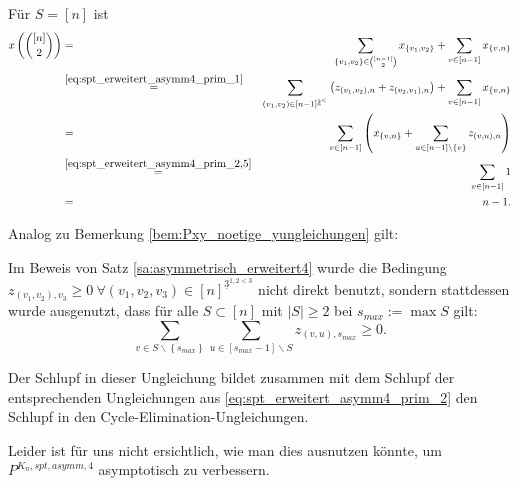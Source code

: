 \documentclass[10p,a4paper,BCOR = 12mm, DIV=15]{scrbook}
\begin{document}
{\begin{bew}
Für $S = \left[n\right]$ ist
{
\allowdisplaybreaks
\begin{eqnarray*}
x\left({\left[n\right] \choose 2}\right) & = & \sum_{\left\{v_1, v_2\right\} \in {\left[n-1\right] \choose 2}} x_{\left\{v_1, v_2\right\}} + \sum_{v \in \left[n-1\right]} x_{\left\{v, n\right\}} \\
& \stackrel{\eqref{eq:spt_erweitert_asymm4_prim_1}}{=} & \sum_{\left(v_1, v_2\right) \in \left[n-1\right]^{\underline{2}^<}} \left(z_{\left(v_1, v_2\right), n} + z_{\left(v_2, v_1\right), n}\right) + \sum_{v \in \left[n-1\right]} x_{\left\{v, n\right\}} \\
& = & \sum_{v \in \left[n-1\right]} \left(x_{\left\{v, n\right\}} + \sum_{u \in \left[n-1\right] \backslash \left\{v\right\}} z_{\left(v, u\right), n}\right) \\
& \stackrel{\eqref{eq:spt_erweitert_asymm4_prim_2,5}}{=} & \sum_{v \in \left[n-1\right] } 1 \\
& = & n - 1.
\end{eqnarray*}
}
\end{bew}

Analog zu Bemerkung \ref{bem:Pxy_noetige_yungleichungen} gilt:

\begin{Bem}
\label{bem:Pasymm4_noetige_yungleichungen}
Im Beweis von Satz \ref{sa:asymmetrisch_erweitert4} wurde die Bedingung $z_{\left(v_1, v_2\right), v_3} \geq 0 \ \forall \left(v_1, v_2, v_3\right)\in \left[n\right]^{\underline{3}^{1, 2<3}}$ nicht direkt benutzt, sondern stattdessen wurde ausgenutzt, dass für alle $S\subset \left[n\right]$ mit $\left|S\right| \geq 2$ bei $s_{max} := \max S$ gilt:
\begin{displaymath}
\sum_{v \in S \backslash \left\{s_{max}\right\}} \sum_{u \in \left[s_{max}-1\right] \backslash S} z_{\left(v, u\right), s_{max}} \geq 0.
\end{displaymath}

Der Schlupf in dieser Ungleichung bildet zusammen mit dem Schlupf der entsprechenden Ungleichungen aus \eqref{eq:spt_erweitert_asymm4_prim_2} den Schlupf in den Cycle-Elimination-Ungleichungen.

Leider ist für uns nicht ersichtlich, wie man dies ausnutzen könnte, um $P^{K_n, spt, asymm, 4}$ asymptotisch zu verbessern.
\end{Bem}

}
\end{document}
